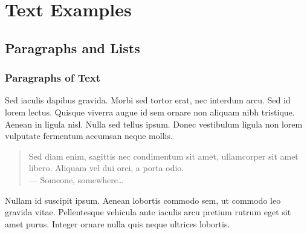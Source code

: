 \section{Text Examples} %


\subsection{Paragraphs and Lists}

\begin{frame}
    \frametitle{Paragraphs of Text}

    Sed iaculis \alert{dapibus gravida}. Morbi sed tortor erat, nec interdum arcu. Sed id lorem lectus. Quisque viverra augue id sem ornare non aliquam nibh tristique. Aenean in ligula nisl. Nulla sed tellus ipsum. Donec vestibulum ligula non lorem vulputate fermentum accumsan neque mollis.

    \bigskip %

    \begin{quote}
        Sed diam enim, sagittis nec condimentum sit amet, ullamcorper sit amet libero. Aliquam vel dui orci, a porta odio.\\
        --- Someone, somewhere\ldots
    \end{quote}

    \bigskip %

    Nullam id suscipit ipsum. Aenean lobortis commodo sem, ut commodo leo gravida vitae. Pellentesque vehicula ante iaculis arcu pretium rutrum eget sit amet purus. Integer ornare nulla quis neque ultrices lobortis.
\end{frame}


